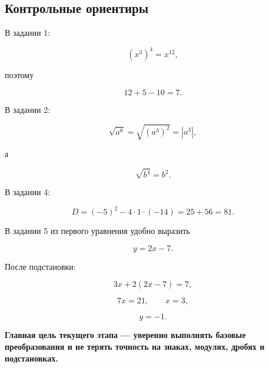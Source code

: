 \documentclass[a4paper,12pt]{article}
\begin{document}
\vspace{8mm}

\subsection{Контрольные ориентиры}

В задании 1:

\[
(x^3)^4=x^{12},
\]

поэтому

\[
12+5-10=7.
\]

В задании 2:

\[
\sqrt{a^6}
=
\sqrt{(a^3)^2}
=
|a^3|,
\]

а

\[
\sqrt{b^4}=b^2.
\]

В задании 4:

\[
D=(-5)^2-4\cdot1\cdot(-14)
=25+56
=81.
\]

В задании 5 из первого уравнения удобно выразить

\[
y=2x-7.
\]

После подстановки:

\[
3x+2(2x-7)=7,
\]

\[
7x=21,
\qquad
x=3,
\]

\[
y=-1.
\]

\vfill

\begin{center}
{\color{darkaccent}\bfseries
Главная цель текущего этапа --- уверенно выполнять базовые преобразования
и не терять точность на знаках, модулях, дробях и подстановках.}
\end{center}
\end{document}
